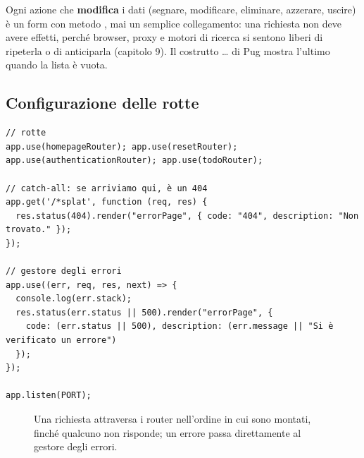 Ogni azione che \textbf{modifica} i dati (segnare, modificare, eliminare,
azzerare, uscire) è un form con metodo , mai un semplice
collegamento: una richiesta  non deve avere effetti, perché browser,
proxy e motori di ricerca si sentono liberi di ripeterla o di anticiparla
(capitolo 9). Il costrutto \ldots{} di Pug mostra
l'ultimo  quando la lista è vuota.

\subsection{Configurazione delle rotte}

\begin{lstlisting}[style=js, name=index.js, firstnumber=28]
// rotte
app.use(homepageRouter); app.use(resetRouter);
app.use(authenticationRouter); app.use(todoRouter);

// catch-all: se arriviamo qui, è un 404
app.get('/*splat', function (req, res) {
  res.status(404).render("errorPage", { code: "404", description: "Non trovato." });
});

// gestore degli errori
app.use((err, req, res, next) => {
  console.log(err.stack);
  res.status(err.status || 500).render("errorPage", {
    code: (err.status || 500), description: (err.message || "Si è verificato un errore")
  });
});

app.listen(PORT);
\end{lstlisting}

\begin{figure}[H]
  \centering
  \caption{Una richiesta attraversa i router nell'ordine in cui sono montati,
           finché qualcuno non risponde; un errore passa direttamente al gestore
           degli errori.}
  \label{fig:rotte-todo}
\end{figure}

